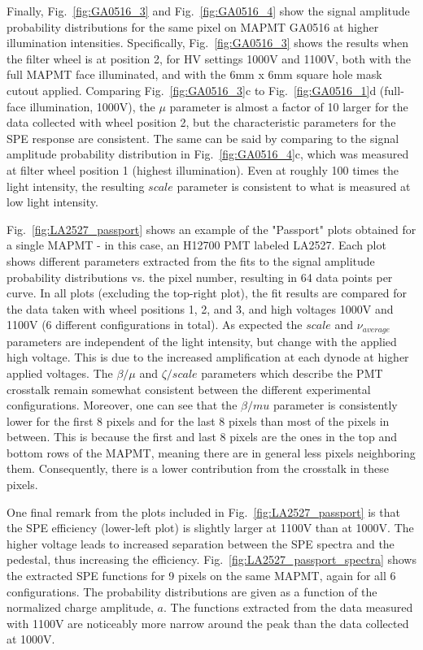 Finally, Fig.~\ref{fig:GA0516_3} and Fig.~\ref{fig:GA0516_4} show the signal amplitude probability distributions for the same pixel on MAPMT GA0516 at higher illumination intensities. 
Specifically, Fig.~\ref{fig:GA0516_3} shows the results when the filter wheel is at position 2, for HV settings 1000V and 1100V, both with the full MAPMT face illuminated, and with the 6mm x 6mm square hole mask cutout applied. 
Comparing Fig.~\ref{fig:GA0516_3}c to Fig.~\ref{fig:GA0516_1}d (full-face illumination, 1000V), the $\mu$ parameter is almost a factor of 10 larger for the data collected with wheel position 2, but the characteristic parameters for the SPE response are consistent. 
The same can be said by comparing to the signal amplitude probability distribution in Fig.~\ref{fig:GA0516_4}c, which was measured at filter wheel position 1 (highest illumination). 
Even at roughly 100 times the light intensity, the resulting $scale$ parameter is consistent to what is measured at low light intensity. 

Fig.~\ref{fig:LA2527_passport} shows an example of the "Passport" plots obtained for a single MAPMT - in this case, an H12700 PMT labeled LA2527. 
Each plot shows different parameters extracted from the fits to the signal amplitude probability distributions vs. the pixel number, resulting in 64 data points per curve.
In all plots (excluding the top-right plot), the fit results are compared for the data taken with wheel positions 1, 2, and 3, and high voltages 1000V and 1100V (6 different configurations in total).
As expected the $scale$ and $\nu_{average}$ parameters are independent of the light intensity, but change with the applied high voltage. 
This is due to the increased amplification at each dynode at higher applied voltages.
The $\beta/\mu$ and $\zeta/scale$ parameters which describe the PMT crosstalk remain somewhat consistent between the different experimental configurations. 
Moreover, one can see that the $\beta/mu$ parameter is consistently lower for the first 8 pixels and for the last 8 pixels than most of the pixels in between.
This is because the first and last 8 pixels are the ones in the top and bottom rows of the MAPMT, meaning there are in general less pixels neighboring them.
Consequently, there is a lower contribution from the crosstalk in these pixels.

One final remark from the plots included in Fig.~\ref{fig:LA2527_passport} is that the SPE efficiency (lower-left plot) is slightly larger at 1100V than at 1000V. The higher voltage leads to increased separation between the SPE spectra and the pedestal, thus increasing the efficiency. 
Fig.~\ref{fig:LA2527_passport_spectra} shows the extracted SPE functions for 9 pixels on the same MAPMT, again for all 6 configurations. The probability distributions are given as a function of the normalized charge amplitude, $a$. The functions extracted from the data measured with 1100V are noticeably more narrow around the peak than the data collected at 1000V.

